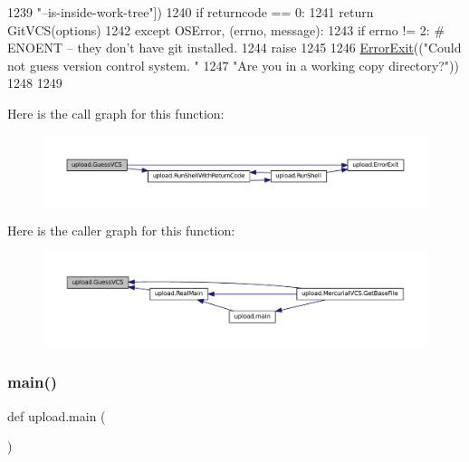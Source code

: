 \begin{DoxyCode}
1239                                               \textcolor{stringliteral}{"--is-inside-work-tree"}])
1240     \textcolor{keywordflow}{if} returncode == 0:
1241       \textcolor{keywordflow}{return} GitVCS(options)
1242   \textcolor{keywordflow}{except} OSError, (errno, message):
1243     \textcolor{keywordflow}{if} errno != 2:  \textcolor{comment}{# ENOENT -- they don't have git installed.}
1244       \textcolor{keywordflow}{raise}
1245 
1246   \hyperlink{namespaceupload_adea53186a1d73e92cc839b7c35c2c044}{ErrorExit}((\textcolor{stringliteral}{"Could not guess version control system. "}
1247              \textcolor{stringliteral}{"Are you in a working copy directory?"}))
1248 
1249 
\end{DoxyCode}
Here is the call graph for this function\+:
\nopagebreak
\begin{figure}[H]
\begin{center}
\leavevmode
\includegraphics[width=350pt]{namespaceupload_a31390568253accd22ee51861eaeb99bd_cgraph}
\end{center}
\end{figure}
Here is the caller graph for this function\+:
\nopagebreak
\begin{figure}[H]
\begin{center}
\leavevmode
\includegraphics[width=350pt]{namespaceupload_a31390568253accd22ee51861eaeb99bd_icgraph}
\end{center}
\end{figure}
\mbox{\label{namespaceupload_aef3fcf7a8d77d13ba75adbf58b6c43ee}} 
\subsubsection{\texorpdfstring{main()}{main()}}
{\footnotesize\ttfamily def upload.\+main (\begin{DoxyParamCaption}{ }\end{DoxyParamCaption})}




